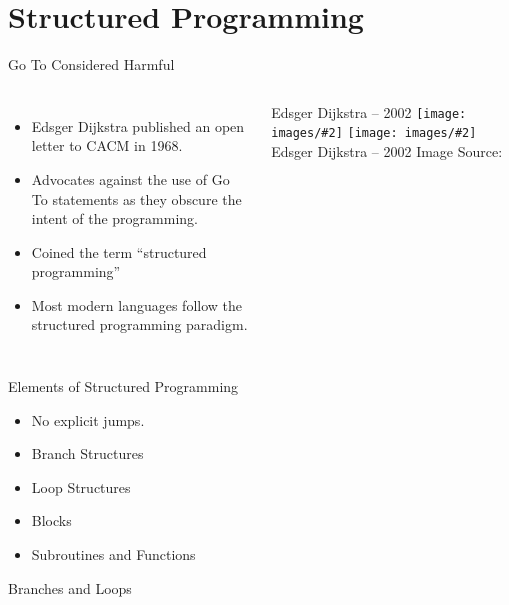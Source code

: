 \documentclass[handout]{beamer}
\makeatletter
\newcommand{\image}[3][\@nil]{%
        \def\tmp{#1}%
        \begin{center}
        \ifx\tmp\@nnil
            \texttt{[image: images/\#2]}
        \else
            \texttt{[image: images/\#2]}
            \linebreak
            #1
        \fi
        \linebreak
        {\tiny Image Source:\thinspace{\tiny #3}}
        \end{center}
}
\newenvironment{code}{%
 \VerbatimEnvironment
 \begin{adjustbox}{max width=\textwidth, max height=0.7\textheight}
 \begin{BVerbatim}
  }{
  \end{BVerbatim}
 \end{adjustbox}
}
\makeatother
\begin{document}
\section{Structured Programming}
\begin{frame}{Go To Considered Harmful}
\begin{columns}
\begin{itemize}
    \item Edsger Dijkstra published an open letter to CACM in 1968.
    \item Advocates against the use of Go To statements as they obscure the intent of the programming.
    \item Coined the term ``structured programming''
    \item Most modern languages follow the structured programming paradigm.
\end{itemize}
\image[Edsger Dijkstra -- 2002]{dijkstra}{Wikipedia}
\end{columns}
\end{frame}


\begin{frame}{Elements of Structured Programming}
    \begin{itemize}
        \item No explicit jumps.
        \item Branch Structures
        \item Loop Structures
        \item Blocks
        \item Subroutines and Functions
    \end{itemize}
\end{frame}


\begin{frame}[fragile,t]{Branches and Loops}
\begin{columns}[t]
\end{columns}
\end{frame}
\end{document}
